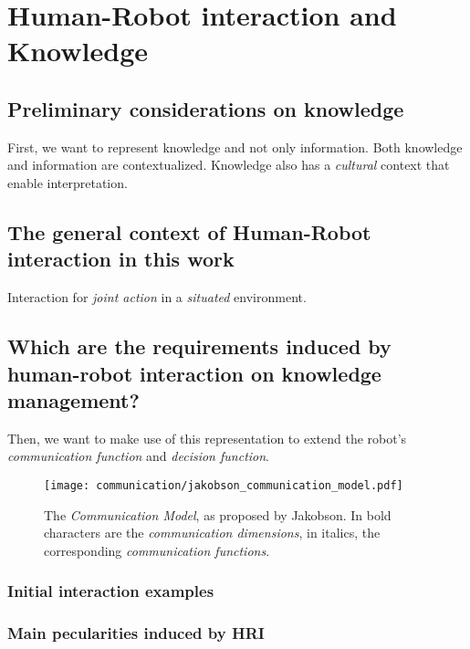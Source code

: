 \chapter{Human-Robot interaction and Knowledge}

\section{Preliminary considerations on knowledge}
\label{sect|on-knowledge}

First, we want to represent knowledge and not only information.  Both knowledge
and information are contextualized. Knowledge also has a \emph{cultural}
context that enable interpretation. 

\section{The general context of Human-Robot interaction in this work}
\label{sect|general-context}

Interaction for \emph{joint action} in a \emph{situated} environment.

\section{Which are the requirements induced by human-robot interaction on knowledge management?}
\label{sect|krs-requirements-hri}

Then, we want to make use of this representation to extend the robot's
\emph{communication function} and \emph{decision function}.

\begin{figure}%
\centering
  \texttt{[image: communication/jakobson\_communication\_model.pdf]}
  \caption{The \emph{Communication Model}, as proposed by Jakobson. In bold
  characters are the \emph{communication dimensions}, in italics, the
  corresponding \emph{communication functions}.}
  \label{fig|jakobson_communication_model}
\end{figure}

\subsection{Initial interaction examples}
\label{sect|initial-examples}

\subsection{Main pecularities induced by HRI}
\label{sect|pecularities-krs-for-hri}

